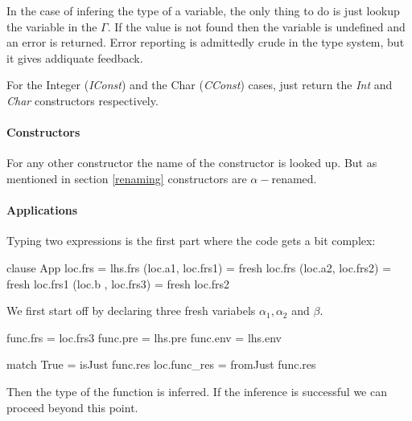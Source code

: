 In the case of infering the type of a variable, the only thing to do is just lookup the variable in the $\Gamma$. If the value is not found then the variable is undefined and an error is returned. Error reporting is admittedly crude in the type system, but it gives addiquate feedback.

For the Integer (\emph{IConst}) and the Char (\emph{CConst}) cases, just return the \emph{Int} and \emph{Char} constructors respectively.

\paragraph{Constructors}
For any other constructor the name of the constructor is looked up. But as mentioned in section \ref{renaming} constructors are $\alpha-$renamed.


\paragraph{Applications}
Typing two expressions is the first part where the code gets a bit complex:

\begin{code}
    clause App
       loc.frs            = lhs.frs
       (loc.a1, loc.frs1) = fresh loc.frs
       (loc.a2, loc.frs2) = fresh loc.frs1
       (loc.b , loc.frs3) = fresh loc.frs2
\end{code}
We first start off by declaring three fresh variabels $\alpha_1, \alpha_2$ and $\beta$.

\begin{code}
       func.frs = loc.frs3
       func.pre = lhs.pre
       func.env = lhs.env
       
       match True = isJust func.res       
       loc.func_res = fromJust func.res
\end{code}
Then the type of the function is inferred. If the inference is successful we can proceed beyond this point.

